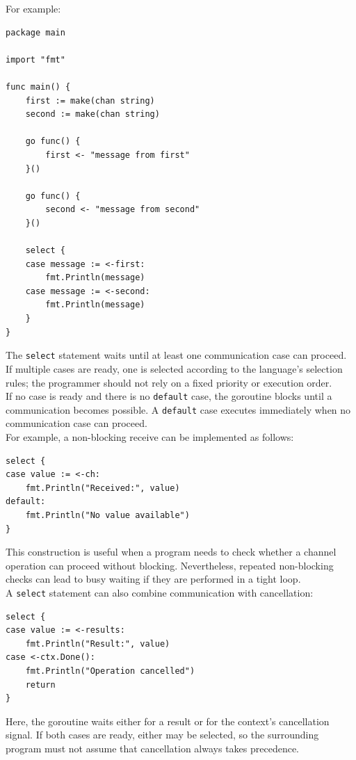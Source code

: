 For example:

\begin{lstlisting}
package main

import "fmt"

func main() {
    first := make(chan string)
    second := make(chan string)

    go func() {
        first <- "message from first"
    }()

    go func() {
        second <- "message from second"
    }()

    select {
    case message := <-first:
        fmt.Println(message)
    case message := <-second:
        fmt.Println(message)
    }
}
\end{lstlisting}

The \texttt{select} statement waits until at least one communication case can proceed. If multiple cases are ready, one is selected according to the language's selection rules; the programmer should not rely on a fixed priority or execution order.\\

If no case is ready and there is no \texttt{default} case, the goroutine blocks until a communication becomes possible. A \texttt{default} case executes immediately when no communication case can proceed.\\

For example, a non-blocking receive can be implemented as follows:

\begin{lstlisting}
select {
case value := <-ch:
    fmt.Println("Received:", value)
default:
    fmt.Println("No value available")
}
\end{lstlisting}

This construction is useful when a program needs to check whether a channel operation can proceed without blocking. Nevertheless, repeated non-blocking checks can lead to busy waiting if they are performed in a tight loop.\\

A \texttt{select} statement can also combine communication with cancellation:

\begin{lstlisting}
select {
case value := <-results:
    fmt.Println("Result:", value)
case <-ctx.Done():
    fmt.Println("Operation cancelled")
    return
}
\end{lstlisting}

Here, the goroutine waits either for a result or for the context's cancellation signal. If both cases are ready, either may be selected, so the surrounding program must not assume that cancellation always takes precedence.

